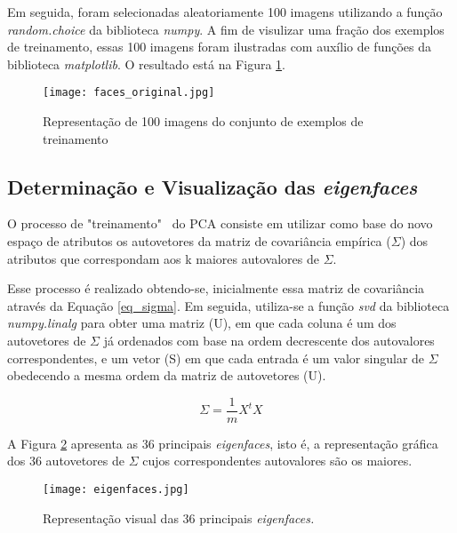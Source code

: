 \documentclass[12pt]{article}
\begin{document}
Em seguida, foram selecionadas aleatoriamente 100 imagens utilizando a função \textit{random.choice} da biblioteca \textit{numpy}. A fim de visulizar uma fração dos exemplos de treinamento, essas 100 imagens foram ilustradas com auxílio de funções da biblioteca \textit{matplotlib}. O resultado está na Figura \ref{faces_original}. 

\begin{figure} [htp]
\begin{center}
\texttt{[image: faces\_original.jpg]}
\caption{Representação de 100 imagens do conjunto de exemplos de treinamento} \label{faces_original}
\end{center}
\end{figure}

\subsection{Determinação e Visualização das \textit{eigenfaces}}
O processo de "treinamento" \ do PCA consiste em utilizar como base do novo espaço de atributos os autovetores da matriz de covariância empírica ($\Sigma$) dos atributos que correspondam aos k maiores autovalores de $\Sigma$. 

Esse processo é realizado obtendo-se, inicialmente essa matriz de covariância através da Equação \ref{eq_sigma}. Em seguida, utiliza-se a função \textit{svd} da biblioteca \textit{numpy.linalg} para obter uma matriz (U), em que cada coluna é um dos autovetores de $\Sigma$ já ordenados com base na ordem decrescente dos autovalores correspondentes, e um vetor (S) em que cada entrada é um valor singular de $\Sigma$ obedecendo a mesma ordem da matriz de autovetores (U).

\begin{equation} \label{eq_sigma}
\Sigma = \frac{1}{m} X^tX
\end{equation}

A Figura \ref{eigenfaces} apresenta as 36 principais \textit{eigenfaces}, isto é, a representação gráfica dos 36 autovetores de $\Sigma$ cujos correspondentes autovalores são os maiores. 

\begin{figure} [htp]
\begin{center}
\texttt{[image: eigenfaces.jpg]}
\caption{Representação visual das 36 principais \textit{eigenfaces.}} \label{eigenfaces}
\end{center}
\end{figure}
\end{document}
